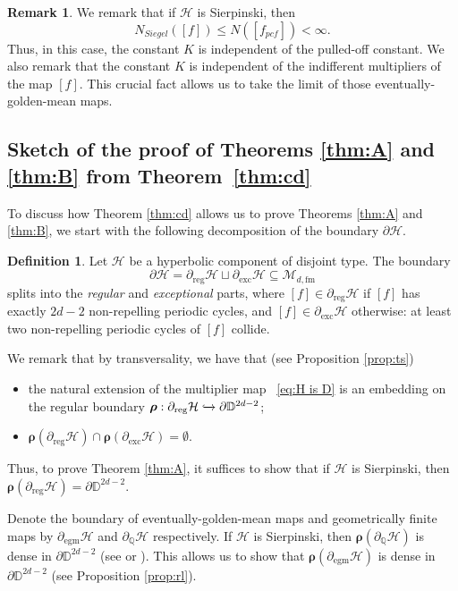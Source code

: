 \documentclass[11pt, reqno]{amsart}
\numberwithin{equation}{section}
\theoremstyle{plain}
\theoremstyle{theorem}
\theoremstyle{plain}
\theoremstyle{definition}
\newtheorem{defn}[theorem]{Definition}
\newtheorem{rmk}[theorem]{Remark}
\newcommand{\Q}{\mathbb{Q}}
\newcommand{\D}{\mathbb{D}}
\newcommand{\fm}{\text{fm}}
\numberwithin{figure}{section}
\begin{document}
\begin{rmk}
\label{rem:N_Siegel}
We remark that if $\mathcal{H}$ is Sierpinski, then 
$$
N_{Siegel}([f]) \leq N([f_{pcf}]) < \infty.
$$
Thus, in this case, the constant $K$ is independent of the pulled-off constant.
We also remark that the constant $K$ is independent of the indifferent multipliers of the map $[f]$. This crucial fact allows us to take the limit of those eventually-golden-mean maps.
\end{rmk}

\subsection{Sketch of the proof of Theorems \ref{thm:A} and \ref{thm:B} from Theorem~\ref{thm:cd}}\label{ss:A_B:from:C} To discuss how Theorem \ref{thm:cd} allows us to prove Theorems \ref{thm:A} and \ref{thm:B}, we start with the following decomposition of the boundary $\partial \mathcal{H}$.
\begin{defn}
    Let $\mathcal{H}$ be a hyperbolic component of disjoint type. The boundary 
$$
\partial \mathcal{H} = \partial_{\operatorname{reg}}\mathcal{H} \sqcup \partial_{\operatorname{exc}}\mathcal{H}\subseteq \mathcal{M}_{d, \fm}
$$ 
splits into the \emph{regular} and \emph{exceptional} parts, where $[f] \in \partial_{\operatorname{reg}}\mathcal{H}$ if $[f]$ has exactly $2d-2$ non-repelling periodic cycles, and $[f] \in \partial_{\operatorname{exc}}\mathcal{H}$ otherwise: at least two non-repelling periodic cycles of $[f]$ collide. 
\end{defn}
We remark that by transversality,  we have that (see Proposition \ref{prop:ts})
\begin{itemize}
    \item the natural extension of the multiplier map ~\eqref{eq:H is D} is an embedding on the regular boundary $\boldsymbol{\rho}: \partial_{\operatorname{reg}}\mathcal{H} \xhookrightarrow{} \partial\D^{2d-2}$;
    \item $\boldsymbol{\rho}(\partial_{\operatorname{reg}}\mathcal{H}) \cap \boldsymbol{\rho}(\partial_{\operatorname{exc}}\mathcal{H}) = \emptyset$.
\end{itemize}
Thus, to prove Theorem \ref{thm:A}, it suffices to show that if $\mathcal{H}$ is Sierpinski, then $\boldsymbol{\rho}(\partial_{\operatorname{reg}}\mathcal{H}) =\partial\D^{2d-2}$.


Denote the boundary of eventually-golden-mean maps and geometrically finite maps by $\partial_{\operatorname{egm}}\mathcal{H}$ and $\partial_{\operatorname{\Q}}\mathcal{H}$ respectively.
If $\mathcal{H}$ is Sierpinski, then $\boldsymbol{\rho}(\partial_{\operatorname{\Q}}\mathcal{H})$ is dense in $\partial \D^{2d-2}$ (see \cite{CT18} or \cite{Luo21b}).
This allows us to show that $\boldsymbol{\rho}(\partial_{\operatorname{egm}}\mathcal{H})$ is dense in $\partial\D^{2d-2}$ (see Proposition \ref{prop:rl}).
\end{document}
